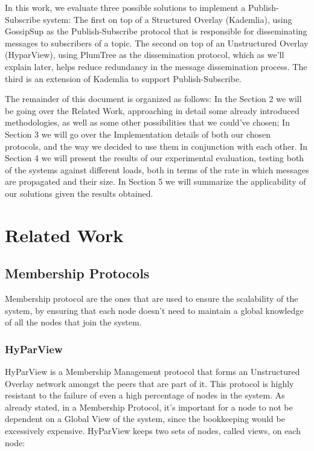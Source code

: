 \documentclass[sigconf]{acmart}
\begin{document}
In this work, we evaluate three possible solutions to implement a Publish-Subscribe system: The first on top of a Structured Overlay (Kademlia), using GossipSup as the Publish-Subscribe protocol that is responsible for disseminating messages to subscribers of a topic.
The second on top of an Unstructured Overlay (HyparView), using PlumTree as the dissemination protocol, which as we’ll explain later, helps reduce redundancy in the message dissemination process.
The third is an extension of Kademlia to support Publish-Subscribe.

The remainder of this document is organized as follows:
In the Section 2 we will be going over the Related Work, approaching in detail some already introduced methodologies, as well as some other possibilities that we could’ve chosen; In Section 3 we will go over the Implementation details of both our chosen protocols, and the way we decided to use them in conjunction with each other. In Section 4 we will present the results of our experimental evaluation, testing both of the systems against different loads, both in terms of the rate in which messages are propagated and their size. In Section 5 we will summarize the applicability of our solutions given the results obtained.

\section{Related Work}

\subsection{Membership Protocols}

Membership protocol are the ones that are used to ensure the scalability of the system, by ensuring that each node doesn't need to maintain a global knowledge of all the nodes that join the system.

\subsubsection{HyParView}

HyParView is a Membership Management protocol that forms an Unstructured Overlay network amongst the peers that are part of it. 
This protocol is highly resistant to the failure of even a high percentage of nodes in the system. As already stated, in a Membership Protocol, it’s important for a node to not be dependent on a Global View of the system, since the bookkeeping would be excessively expensive. HyParView keeps two sets of nodes, called views, on each node: 
\end{document}
